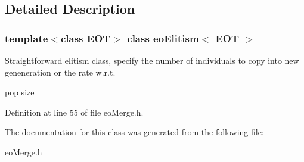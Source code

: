 \subsection{Detailed Description}
\subsubsection*{template$<$class EOT$>$ class eo\-Elitism$<$ EOT $>$}

Straightforward elitism class, specify the number of individuals to copy into new geneneration or the rate w.r.t. 

pop size 



Definition at line 55 of file eo\-Merge.h.

The documentation for this class was generated from the following file:\begin{CompactItemize}
\item 
eo\-Merge.h\end{CompactItemize}
